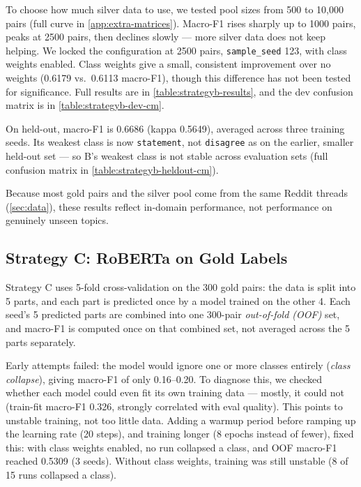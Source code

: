 To choose how much silver data to use, we tested pool sizes from 500 to
10{,}000 pairs (full curve in \autoref{app:extra-matrices}). Macro-F1
rises sharply up to 1000 pairs, peaks at 2500 pairs, then declines slowly
--- more silver data does not keep helping. We locked the configuration
at 2500 pairs, \texttt{sample\_seed} 123, with class weights enabled.
Class weights give a small, consistent improvement over no weights
(0.6179 vs.\ 0.6113 macro-F1), though this difference has not been
tested for significance. Full results are in
\autoref{table:strategyb-results}, and the dev confusion matrix is in
\autoref{table:strategyb-dev-cm}.

On held-out, macro-F1 is 0.6686 (kappa 0.5649), averaged across three
training seeds. Its weakest class is now \texttt{statement}, not
\texttt{disagree} as on the earlier, smaller held-out set --- so B's
weakest class is not stable across evaluation sets (full confusion
matrix in \autoref{table:strategyb-heldout-cm}).

Because most gold pairs and the silver pool come from the same Reddit
threads (\autoref{sec:data}), these results reflect in-domain
performance, not performance on genuinely unseen topics.

\subsection{Strategy C: RoBERTa on Gold Labels}
\label{sec:strategyc}

Strategy C uses 5-fold cross-validation on the 300 gold pairs: the data
is split into 5 parts, and each part is predicted once by a model
trained on the other 4. Each seed's 5 predicted parts are combined into
one 300-pair \emph{out-of-fold (OOF)} set, and macro-F1 is computed once
on that combined set, not averaged across the 5 parts separately.

Early attempts failed: the model would ignore one or more classes
entirely (\emph{class collapse}), giving macro-F1 of only 0.16--0.20. To
diagnose this, we checked whether each model could even fit its own
training data --- mostly, it could not (train-fit macro-F1 0.326,
strongly correlated with eval quality). This points to unstable
training, not too little data. Adding a warmup period before ramping up
the learning rate (20 steps), and training longer (8 epochs instead of
fewer), fixed this: with class weights enabled, no run collapsed a
class, and OOF macro-F1 reached 0.5309 (3 seeds). Without class weights,
training was still unstable (8 of 15 runs collapsed a class).


